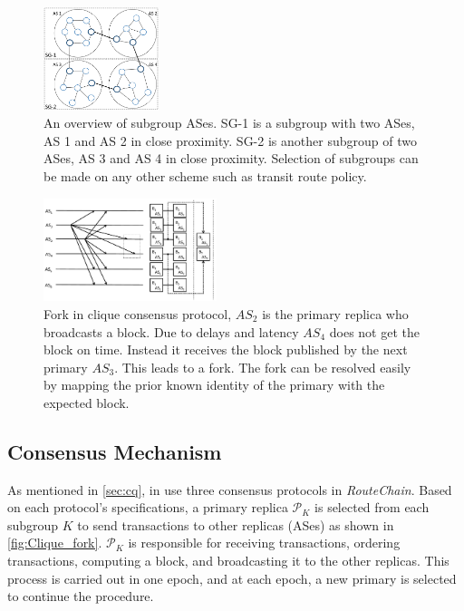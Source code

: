 \documentclass[5p]{elsarticle}
\newcommand{\rc}{{{\em RouteChain}}\xspace}
\begin{document}
\begin{figure}[t]
\begin{center}
\includegraphics[width=0.30\textwidth]{fig/ASes_SG.pdf}
\caption{An overview of subgroup ASes. SG-1 is a subgroup with two ASes, AS 1 and AS 2 in close proximity. SG-2 is another subgroup of two ASes, AS 3 and AS 4 in close proximity. Selection of subgroups can be made on any other scheme such as transit route policy.} 
\label{fig:ASes_SG}
\end{center}
\end{figure}

\begin{figure}[t]
\begin{center}
\includegraphics[width=0.45\textwidth]{fig/bgp_clique.pdf}
\caption{Fork in clique consensus protocol, $AS_2$ is the primary replica who broadcasts a block. Due to delays and latency  $AS_4$ does not get the block on time. Instead it receives the block published by the next primary $AS_3$. This leads to a fork. The fork can be resolved easily by mapping the prior known identity of the primary with the expected block. } 
\label{fig:Clique_fork}
\end{center}
\end{figure}



\subsection{Consensus Mechanism}\label{sec:consen}


As mentioned in \textsection\ref{sec:cq}, in use three consensus protocols in \rc. Based on each protocol's specifications, a primary replica $\mathcal{P}_{K}$ is selected from each subgroup $K$ to send transactions to other replicas (ASes) as shown in \autoref{fig:Clique_fork}. $\mathcal{P}_{K}$ is responsible for receiving transactions, ordering transactions, computing a block, and broadcasting it to the other replicas. This process is carried out in one epoch, and at each epoch, a new primary is selected to continue the procedure. 
\end{document}

